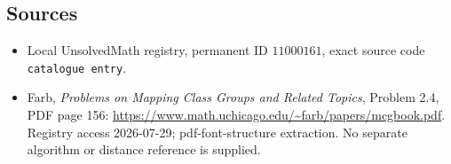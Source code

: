 \documentclass[11pt]{article}
\begin{document}
\subsection{Sources}
\begin{itemize}
\item Local UnsolvedMath registry, permanent ID \(11000161\), exact source code \texttt{catalogue entry}.
\item Farb, \emph{Problems on Mapping Class Groups and Related Topics}, Problem 2.4, PDF page 156: \url{https://www.math.uchicago.edu/~farb/papers/mcgbook.pdf}. Registry access 2026-07-29; pdf-font-structure extraction. No separate algorithm or distance reference is supplied.
\end{itemize}
\end{document}
